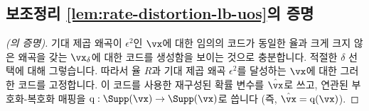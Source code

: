 \documentclass[../../book-main_ko.tex]{subfiles}
\begin{document}
\subsection{보조정리 \ref{lem:rate-distortion-lb-uos}의 증명}\label{sec:app-rate-dist-deferred-proofs}

\begin{proof}[(의 증명)]
    기대 제곱 왜곡이 \(\epsilon^2\)인 \(\vx\)에 대한 임의의 코드가 동일한 율과 크게 크지 않은 왜곡을 갖는 \(\vx_{\delta}\)에 대한 코드를 생성함을 보이는 것으로 충분합니다. 적절한 \(\delta\) 선택에 대해 그렇습니다.
    따라서 율 \(R\)과 기대 제곱 왜곡 \(\epsilon^2\)를 달성하는 \(\vx\)에 대한 그러한 코드를 고정합니다. 이 코드를 사용한 재구성된 확률 변수를 \(\hat{\vx}\)로 쓰고, 연관된 부호화-복호화 매핑을 \(\mathrm{q} : \Supp(\vx) \to \Supp(\vx)\)로 씁니다 (즉, \(\hat{\vx} = \mathrm{q}(\vx)\)).


\end{proof}
\end{document}
